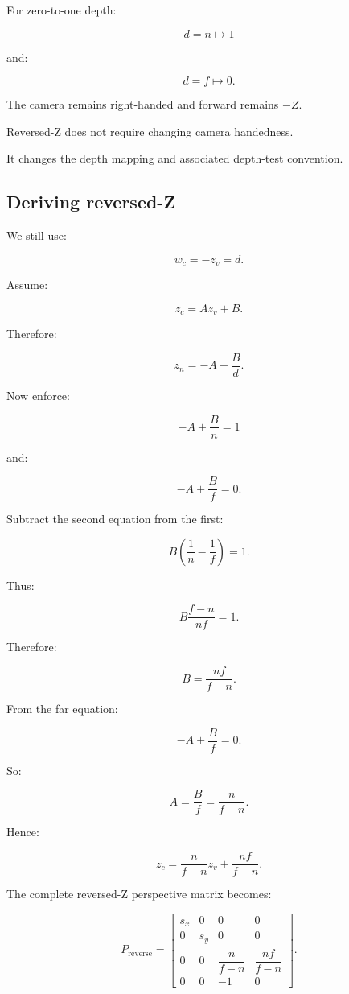 For zero-to-one depth:

\[
 \boxed{ d=n\mapsto1 }
\]

and:

\[
 \boxed{ d=f\mapsto0 }.
\]

The camera remains right-handed and forward remains \(-Z\).

Reversed-Z does not require changing camera handedness.

It changes the depth mapping and associated depth-test convention.

\subsection{Deriving reversed-Z}\label{02-foundations-ii-ch033-deriving-reversed-z}

We still use:

\[
 w_c=-z_v=d.
\]

Assume:

\[
 z_c=Az_v+B.
\]

Therefore:

\[
 z_n=-A+\frac Bd.
\]

Now enforce:

\[
 -A+\frac Bn=1
\]

and:

\[
 -A+\frac Bf=0.
\]

Subtract the second equation from the first:

\[
 B\left(\frac1n-\frac1f\right)=1.
\]

Thus:

\[
 B\frac{f-n}{nf}=1.
\]

Therefore:

\[
 \boxed{ B=\frac{nf}{f-n} }.
\]

From the far equation:

\[
 -A+\frac Bf=0.
\]

So:

\[
 A=\frac Bf=\frac n{f-n}.
\]

Hence:

\[
 \boxed{ z_c= \frac n{f-n}z_v+ \frac{nf}{f-n} }.
\]

The complete reversed-Z perspective matrix becomes:

\[
 \boxed{ P_{\mathrm{reverse}}= \begin{bmatrix} s_x&0&0&0\\ 0&s_y&0&0\\ 0&0&\dfrac n{f-n}&\dfrac{nf}{f-n}\\ 0&0&-1&0 \end{bmatrix} }.
\]


